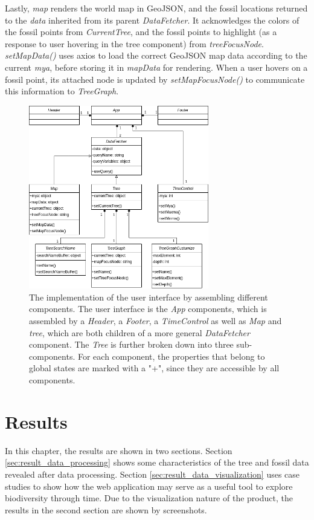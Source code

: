 \documentclass[11pt, a4paper,oneside,chapterprefix=false]{scrbook}
\begin{document}
Lastly, \emph{map} renders the world map in GeoJSON, and the fossil locations returned to the \emph{data} inherited from its parent \emph{DataFetcher}. It acknowledges the colors of the fossil points from \emph{CurrentTree}, and the fossil points to highlight (as a response to user hovering in the tree component) from \emph{treeFocusNode}. \emph{setMapData()} uses axios to load the correct GeoJSON map data according to the current \emph{mya}, before storing it in \emph{mapData} for rendering. When a user hovers on a fossil point, its attached node is updated by \emph{setMapFocusNode()} to communicate this information to \emph{TreeGraph}.

\begin{figure}[h]
	\centering
	\includegraphics[width=0.7\textwidth]{figures/implementation/components}
	\caption{The implementation of the user interface by assembling different components. The user interface is the \emph{App} components, which is assembled by a \emph{Header}, a \emph{Footer}, a \emph{TimeControl} as well as \emph{Map} and \emph{tree}, which are both children of a more general \emph{DataFetcher} component. The \emph{Tree} is further broken down into three sub-components. For each component, the properties that belong to global states are marked with a "+", since they are accessible by all components.}
	\label{fig:components}
\end{figure}
\chapter{Results} \label{chp:results}
In this chapter, the results are shown in two sections. Section \ref{sec:result_data_processing} shows some characteristics of the tree and fossil data revealed after data processing. Section \ref{sec:result_data_visualization} uses case studies to show how the web application may serve as a useful tool to explore biodiversity through time. Due to the visualization nature of the product, the results in the second section are shown by screenshots.
\end{document}
